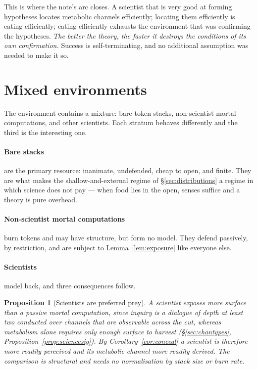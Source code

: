 \documentclass[11pt]{article}
\theoremstyle{plain}
\newtheorem{proposition}[theorem]{Proposition}
\theoremstyle{definition}
\begin{document}
This is where the note's arc closes. A scientist that is very good at forming hypotheses locates
metabolic channels efficiently; locating them efficiently is eating efficiently; eating efficiently
exhausts the environment that was confirming the hypotheses. \emph{The better the theory, the faster
it destroys the conditions of its own confirmation.} Success is self-terminating, and no additional
assumption was needed to make it so.

\section{Mixed environments}
\label{sec:mixed}

The environment contains a mixture: bare token stacks, non-scientist mortal computations, and other
scientists. Each stratum behaves differently and the third is the interesting one.

\paragraph{Bare stacks} are the primary resource: inanimate, undefended, cheap to open, and finite.
They are what makes the shallow-and-external regime of \S\ref{sec:distributions} a regime in which
science does not pay --- when food lies in the open, senses suffice and a theory is pure overhead.

\paragraph{Non-scientist mortal computations} burn tokens and may have structure, but form no model.
They defend passively, by restriction, and are subject to Lemma~\ref{lem:exposure} like everyone else.

\paragraph{Scientists} model back, and three consequences follow.

\begin{proposition}[Scientists are preferred prey]
\label{prop:preferredprey}
A scientist exposes more surface than a passive mortal computation, since inquiry is a dialogue of
depth at least two conducted over channels that are observable across the cut, whereas metabolism
alone requires only enough surface to harvest (\S\ref{sec:chantypes},
Proposition~\ref{prop:sciencesig}). By Corollary~\ref{cor:conceal} a scientist is therefore more
readily perceived and its metabolic channel more readily derived. The comparison is structural and
needs no normalisation by stack size or burn rate.
\end{proposition}
\end{document}
